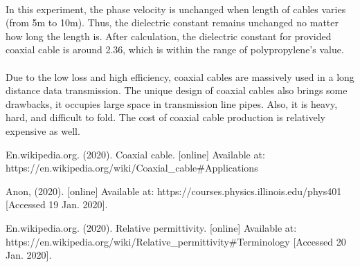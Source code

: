 \documentclass[12pt]{article}
\begin{document}
    \paragraph{}
    In this experiment, the phase velocity is unchanged when length of cables varies (from 5m to 10m). Thus, the dielectric constant remains unchanged no matter how long the length is. After calculation, the dielectric constant for provided coaxial cable is around 2.36, which is within the range of polypropylene's value. 
    \paragraph{}
    Due to the low loss and high efficiency, coaxial cables are massively used in a long distance data transmission. The unique design of coaxial cables also brings some drawbacks, it occupies large space in transmission line pipes. Also, it is heavy, hard, and difficult to fold. The cost of coaxial cable production is relatively expensive as well.   
    
    
    
    
    
    
    
    
    
    
    \newpage   
    \begin{thebibliography}{}
    En.wikipedia.org. (2020). Coaxial cable. [online] Available at: https://en.wikipedia.org/wiki/Coaxial\_cable\#Applications
    
    Anon, (2020). [online] Available at: https://courses.physics.illinois.edu/phys401 [Accessed 19 Jan. 2020].
    
    En.wikipedia.org. (2020). Relative permittivity. [online] Available at: https://en.wikipedia.org/wiki/Relative\_permittivity\#Terminology [Accessed 20 Jan. 2020].
      
      
    \end{thebibliography}
    
\end{document}
